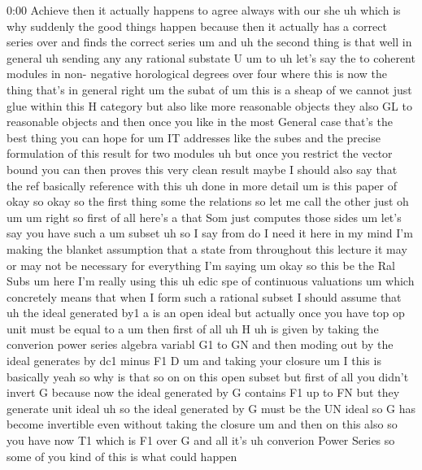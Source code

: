 \begin{unfinished}{0:00}
Achieve  then  it  actually  happens  to
agree  always  with  our  she  uh  which  is
why  suddenly  the  good  things  happen
because  then  it  actually  has  a  correct
series  over  and  finds  the  correct
series
um  and  uh  the  second  thing  is  that
well  in
general  uh  sending
any  any  rational  substate
U
um  to  uh  let's  say  the  to  coherent
modules  in  non-  negative  horological
degrees
over
four  where  this  is  now
the  thing  that's  in  general  right  um  the
subat
of  um  this  is  a  sheap
of  we  cannot  just
glue  within  this  H  category  but  also
like  more  reasonable  objects  they  also
GL  to  reasonable  objects  and  then  once
you  like  in  the  most  General  case  that's
the  best  thing  you  can  hope  for  um  IT
addresses  like  the  subes  and  the  precise
formulation  of  this  result  for  two
modules  uh  but  once  you  restrict  the
vector  bound  you  can  then  proves  this
very  clean
result
maybe  I  should  also  say  that  the  ref
basically  reference  with  this  uh  done  in
more
detail  um  is  this  paper
of  okay
so  okay  so  the  first  thing  some  the
relations  so  let  me  call  the  other  just
oh
um
um  right  so  first  of  all  here's
a  that  Som  just  computes  those  sides
um  let's  say  you  have  such  a
um
subset
uh  so  I  say
from  do  I  need  it
here  in  my  mind  I'm  making  the  blanket
assumption  that  a  state  from  throughout
this  lecture  it  may  or  may  not  be
necessary  for  everything  I'm
saying
um  okay  so  this  be  the  Ral  Subs
um  here  I'm  really  using  this  uh  edic
spe  of  continuous  valuations  um  which
concretely  means  that  when  I  form  such  a
rational  subset  I  should  assume  that  uh
the  ideal  generated  by1  a  is  an  open
ideal  but  actually  once  you  have  top  op
unit  must  be  equal  to
a
um
then  first  of
all  uh
H  uh  is  given  by
taking  the  converion  power  series
algebra  variabl  G1  to  GN  and  then  moding
out  by  the  ideal  generates  by  dc1  minus
F1
D  um  and  taking  your
closure
um
I  this  is
basically  yeah  so  why  is  that  so  on  on
this  open  subset  but  first  of  all  you
didn't  invert  G  because  now  the  ideal
generated  by  G  contains  F1  up  to  FN  but
they  generate  unit  ideal  uh  so  the  ideal
generated  by  G  must  be  the  UN  ideal  so  G
has  become
invertible  even  without  taking  the
closure  um  and  then  on  this  also  so  you
have  now  T1  which  is  F1  over  G  and  all
it's  uh  converion  Power  Series  so  some
of  you  kind  of  this  is  what  could  happen

\end{unfinished}
